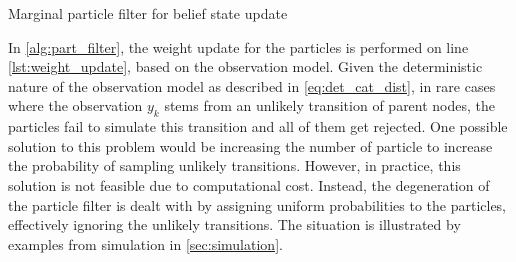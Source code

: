 \begin{algorithm}[H]
	
	\vspace{+4pt}
	\begin{algorithmic}[1]
		\\
		
		 \\
		 \label{lst:weight_update}
		\ENDFOR \\
		\\
		\\
		\ENDFOR 
	\end{algorithmic}
	\caption{Marginal particle filter for belief state update \cite{Studer2016}}
	\label{alg:part_filter}
\end{algorithm}
In \cref{alg:part_filter}, the weight update for the particles is performed on line \autoref{lst:weight_update}, based on the observation model. Given the deterministic nature of the observation model as described in \autoref{eq:det_cat_dist}, in rare cases where the observation $ y_k $ stems from an unlikely transition of parent nodes, the particles fail to simulate this transition and all of them get rejected. One possible solution to this problem would be increasing the number of particle to increase the probability of sampling unlikely transitions. However, in practice, this solution is not feasible due to computational cost. Instead, the degeneration of the particle filter is dealt with by assigning uniform probabilities to the particles, effectively ignoring the unlikely transitions. The situation is illustrated by examples from simulation in \cref{sec:simulation}.

